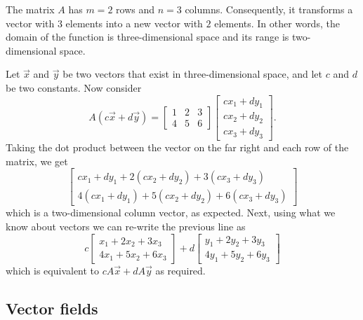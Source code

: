 \documentclass[../book.tex]{subfiles}
\begin{document}
\begin{solution}
The matrix \(A\) has \(m=2\) rows and \(n=3\) columns. Consequently, it transforms a vector with \(3\) elements into a new vector with \(2\) elements. In other words, the domain of the function is three-dimensional space and its range is two-dimensional space.

Let \(\vec{x}\) and \(\vec{y}\) be two vectors that exist in three-dimensional space, and let \(c\) and \(d\) be two constants. Now consider
\begin{equation}\label{eq:vec-29}
A ( c \vec{x} + d  \vec{y} )
= 
\begin{bmatrix}
  1 & 2 & 3 \\
  4 & 5 & 6
\end{bmatrix}
\begin{bmatrix}
  c  x_1 + d y_1 \\
  c  x_2 + d y_2 \\
  c  x_3 + d y_3
\end{bmatrix}.
\end{equation}
Taking the dot product between the vector on the far right and each row of the matrix, we get
\begin{equation}\label{eq:vec-30}
\begin{bmatrix}
  c x_1 + d y_1 
  +
  2(c x_2 + d y_2 )
  + 
  3(c x_3 + d y_3 ) \\
  4(c x_1 + d y_1) 
  +
  5(c x_2 + d y_2 )
  + 
  6(c x_3 + d y_3 )
\end{bmatrix}
\end{equation}
which is a two-dimensional column vector, as expected. Next, using what we know about vectors we can re-write the previous line as
\begin{equation}\label{eq:vec-31}
c
\begin{bmatrix}
  x_1 + 2 x_2 + 3  x_3 \\
  4 x_1 + 5 x_2 + 6 x_3
\end{bmatrix}
+
d
\begin{bmatrix}
  y_1 + 2 y_2 + 3  y_3 \\
  4 y_1 + 5 y_2 + 6 y_3
\end{bmatrix}
\end{equation}
which is equivalent to \(c A \vec{x} + d A \vec{y}\) as required.
\end{solution}

\subsection{Vector fields}
\end{document}

